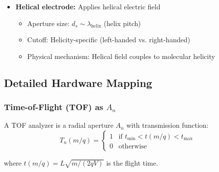 \begin{proposition}
\begin{itemize}
    \item \textbf{Helical electrode:} Applies helical electric field
        \begin{itemize}
        \item Aperture size: $d_s \sim \lambda_{\text{helix}}$ (helix pitch)
        \item Cutoff: Helicity-specific (left-handed vs. right-handed)
        \item Physical mechanism: Helical field couples to molecular helicity
        \end{itemize}
\end{itemize}
\end{proposition}

\subsection{Detailed Hardware Mapping}

\subsubsection{Time-of-Flight (TOF) as $A_n$}

\begin{theorem}
\label{thm:tof_radial}
A TOF analyzer is a radial aperture $A_n$ with transmission function:
\begin{equation}
T_n(m/q) = \begin{cases}
1 & \text{if } t_{\min} < t(m/q) < t_{\max} \\
0 & \text{otherwise}
\end{cases}
\end{equation}

where $t(m/q) = L\sqrt{m/(2qV)}$ is the flight time.
\end{theorem}

